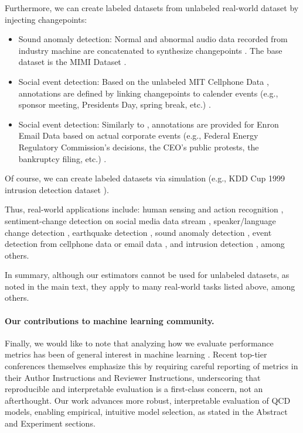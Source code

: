 \documentclass{article}
\theoremstyle{plain}
\theoremstyle{definition}
\theoremstyle{remark}
\begin{document}
Furthermore, we can create labeled datasets from unlabeled real-world dataset by injecting changepoints:
\begin{itemize}
    \item Sound anomaly detection: Normal and abnormal audio data recorded from industry machine are concatenated to synthesize changepoints \citep{gopalan2021bandit_1}. The base dataset is the MIMI Dataset \citep{purohit2019mimii_2}. 
    \item Social event detection: Based on the unlabeled MIT Cellphone Data \citep{eagle2006reality_4}, annotations are defined by linking changepoints to calender events (e.g., sponsor meeting, Presidents Day, spring break, etc.) \citep{keichange_3}. 
    \item Social event detection: Similarly to \citep{keichange_3}, annotations are provided for Enron Email Data \citep{klimt2004introducing_9} based on actual corporate events (e.g., Federal Energy Regulatory Commission's decisions, the CEO's public protests, the bankruptcy filing, etc.) \citep{wang2023change_8}. 
\end{itemize}

Of course, we can create labeled datasets via simulation (e.g., KDD Cup 1999 intrusion detection dataset \citep{kdd_cup_1999_data_5}).

Thus, real-world applications include: human sensing and action recognition  \citep{Bishop_PRML2006, wang2023temporal}, sentiment-change detection on social media data stream \citep{bouchikhi2019kernel_6}, speaker/language change detection \citep{mishra2024spoken_10}, earthquake detection \citep{woollam2022seisbench}, sound anomaly detection \citep{gopalan2021bandit_1}, event detection from cellphone data or email data \citep{keichange_3, wang2023change_8}, and intrusion detection \citep{kdd_cup_1999_data_5}, among others.

In summary, although our estimators cannot be used for unlabeled datasets, as noted in the main text, they apply to many real-world tasks listed above, among others. 

\paragraph{Our contributions to machine learning community.}
Finally, we would like to note that analyzing how we evaluate performance metrics has been of general interest in machine learning \citep{hernandez20041st, LFMR05, LFM06, roc2025}. Recent top-tier conferences themselves emphasize this by requiring careful reporting of metrics in their Author Instructions and Reviewer Instructions, underscoring that reproducible and interpretable evaluation is a first-class concern, not an afterthought. Our work advances more robust, interpretable evaluation of QCD models, enabling empirical, intuitive model selection, as stated in the Abstract and Experiment sections.

















\end{document}
